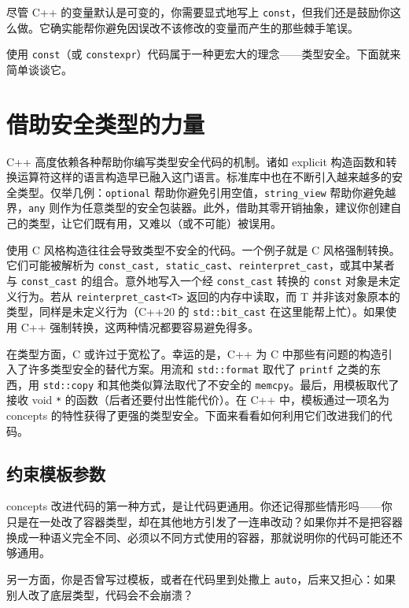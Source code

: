 尽管 C++ 的变量默认是可变的，你需要显式地写上 \texttt{const}，但我们还是鼓励你这么做。它确实能帮你避免因误改不该修改的变量而产生的那些棘手笔误。

使用 \texttt{const}（或 \texttt{constexpr}）代码属于一种更宏大的理念——类型安全。下面就来简单谈谈它。

\section{借助安全类型的力量}

C++ 高度依赖各种帮助你编写类型安全代码的机制。诸如 explicit 构造函数和转换运算符这样的语言构造早已融入这门语言。标准库中也在不断引入越来越多的安全类型。仅举几例：\texttt{optional} 帮助你避免引用空值，\texttt{string\_\allowbreak{}view} 帮助你避免越界，\texttt{any} 则作为任意类型的安全包装器。此外，借助其零开销抽象，建议你创建自己的类型，让它们既有用，又难以（或不可能）被误用。

\label{idx:504}
使用 C 风格构造往往会导致类型不安全的代码。一个例子就是 C 风格强制转换。它们可能被解析为 \texttt{const\_\allowbreak{}cast,\allowbreak{} static\_\allowbreak{}cast}、\texttt{reinterpret\_\allowbreak{}cast}，或其中某者与 \texttt{const\_\allowbreak{}cast} 的组合。意外地写入一个经 \texttt{const\_\allowbreak{}cast} 转换的 \texttt{const} 对象是未定义行为。若从 \texttt{reinterpret\_\allowbreak{}cast<T>} 返回的内存中读取，而 T 并非该对象原本的类型，同样是未定义行为（C++20 的 \texttt{std::\allowbreak{}bit\_\allowbreak{}cast} 在这里能帮上忙）。如果使用 C++ 强制转换，这两种情况都要容易避免得多。

在类型方面，C 或许过于宽松了。幸运的是，C++ 为 C 中那些有问题的构造引入了许多类型安全的替代方案。用流和 \texttt{std::\allowbreak{}format} 取代了 \texttt{printf} 之类的东西，用 \texttt{std::copy} 和其他类似算法取代了不安全的 \texttt{memcpy}。最后，用模板取代了接收 void \texttt{*} 的函数（后者还要付出性能代价）。在 C++ 中，模板通过一项名为 concepts 的特性获得了更强的类型安全。下面来看看如何利用它们改进我们的代码。

\subsection{约束模板参数}

\label{idx:505}
concepts 改进代码的第一种方式，是让代码更通用。你还记得那些情形吗——你只是在一处改了容器类型，却在其他地方引发了一连串改动？如果你并不是把容器换成一种语义完全不同、必须以不同方式使用的容器，那就说明你的代码可能还不够通用。

另一方面，你是否曾写过模板，或者在代码里到处撒上 \texttt{auto}，后来又担心：如果别人改了底层类型，代码会不会崩溃？

